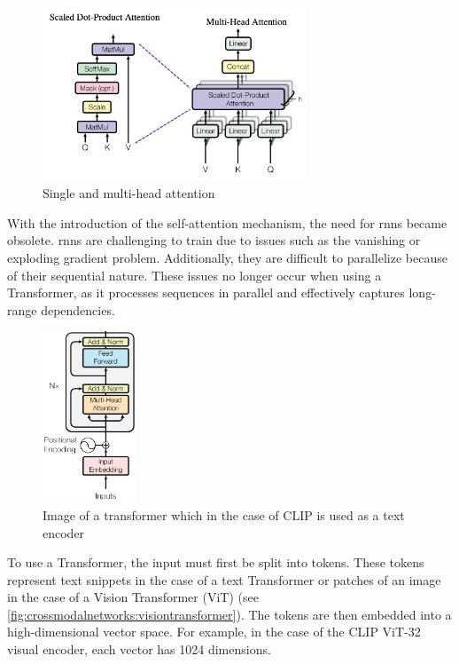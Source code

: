     \begin{figure}[]
        \centering
        \includegraphics[width=0.7\textwidth]{Images/crossmodalnetworks/attention.png}
        \caption{Single and multi-head attention\cite{attentionisallyouneed}}
        \label{fig:crossmodalnetworks:attention}
    \end{figure}

    With the introduction of the self-attention mechanism, the need for \acrshort{rnn}s became obsolete. 
    \acrshort{rnn}s are challenging to train due to issues such as the vanishing or exploding gradient problem. 
    Additionally, they are difficult to parallelize because of their sequential nature. 
    These issues no longer occur when using a Transformer, as it processes sequences in parallel and effectively captures long-range dependencies.


    \begin{figure}[]
        \centering
        \includegraphics[width=0.25\textwidth]{Images/crossmodalnetworks/The-Transformer-encoder-structure.png}
        \caption{Image of a transformer which in the case of CLIP is used as a text encoder\cite{attentionisallyouneed}}
        \label{fig:crossmodalnetworks:transformer}
    \end{figure}

    To use a Transformer, the input must first be split into tokens. 
    These tokens represent text snippets in the case of a text Transformer or patches of an image in the case of a Vision Transformer (ViT) (see \cref{fig:crossmodalnetworks:visiontransformer}). 
    The tokens are then embedded into a high-dimensional vector space. 
    For example, in the case of the CLIP ViT-32 visual encoder, each vector has 1024 dimensions.


